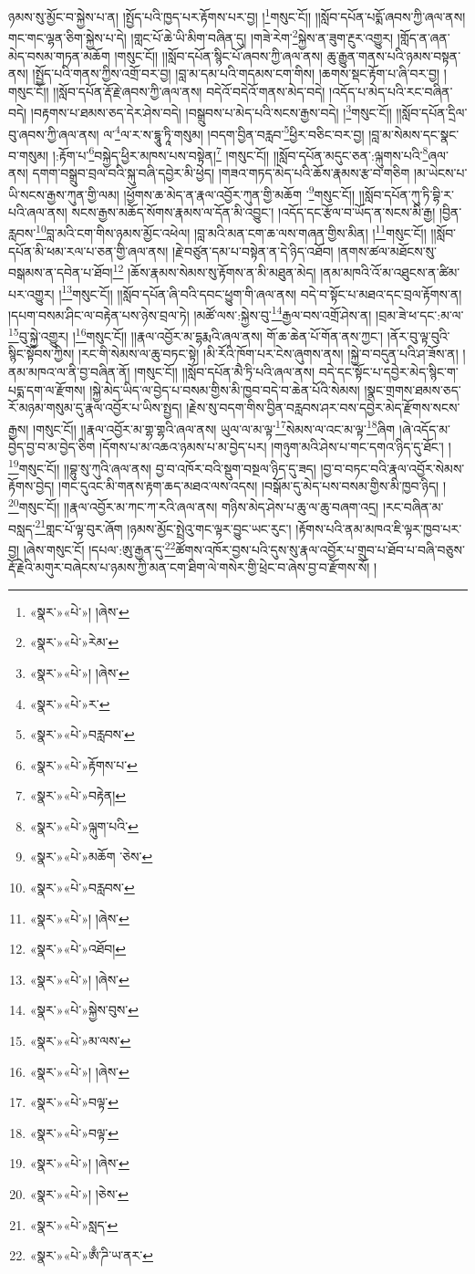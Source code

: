 ཉམས་སུ་མྱོང་བ་སྐྱེས་པ་ན། །སྤྱོད་པའི་ཁྱད་པར་རྟོགས་པར་བྱ། །\footnote{«སྣར་»«པེ་»། །ཞེས་}གསུང་ངོ།། །།སློབ་དཔོན་པདྨོ་ཞབས་ཀྱི་ཞལ་ནས། གང་གང་ལྷན་ཅིག་སྐྱེས་པ་དེ། །གླང་པོ་ཆེ་ཡི་མིག་བཞིན་དུ། །གཟེ་རེག་\footnote{«སྣར་»«པེ་»རེམ་}སྐྱེས་ན་ཟུག་རྔུར་འགྱུར། །གློད་ན་ཞན་མེད་བསམ་གཏན་མཆོག །གསུང་ངོ།། །།སློབ་དཔོན་སྙིང་པོ་ཞབས་ཀྱི་ཞལ་ནས། ཆུ་རྒྱུན་གནས་པའི་ཉམས་བསྟན་ནས། །སྤྱོད་པའི་གནས་ཀྱིས་འགྲོ་བར་བྱ། །བླ་མ་དམ་པའི་གདམས་ངག་གིས། །ཆགས་སྡང་རྟོག་པ་ཞི་བར་བྱ། །གསུང་ངོ།། །།སློབ་དཔོན་རྡོ་རྗེ་ཞབས་ཀྱི་ཞལ་ནས། བདེའོ་བདེའོ་གནས་མེད་བདེ། །འདོད་པ་མེད་པའི་རང་བཞིན་བདེ། །བརྟགས་པ་ཐམས་ཅད་དེར་ཤེས་བདེ། །བསྒྲུབས་པ་མེད་པའི་སངས་རྒྱས་བདེ། །\footnote{«སྣར་»«པེ་»། །ཞེས་}གསུང་ངོ།། །།སློབ་དཔོན་དྲིལ་བུ་ཞབས་ཀྱི་ཞལ་ནས། ལ་\footnote{«སྣར་»«པེ་»ར་}ལ་ར་ས་དྷཱུ་ཏཱི་གསུམ། །བདག་བྱིན་བརླབ་\footnote{«སྣར་»«པེ་»བརླབས་}ཕྱིར་བཅིང་བར་བྱ། །བླ་མ་སེམས་དང་སྣང་བ་གསུམ། །:རྟོག་པ་\footnote{«སྣར་»«པེ་»རྟོགས་པ་}བསྐྱེད་ཕྱིར་མཁས་པས་བསྟེན།\footnote{«སྣར་»«པེ་»བརྟེན།} །གསུང་ངོ།། །།སློབ་དཔོན་མདུང་ཅན་:ལྐུགས་པའི་\footnote{«སྣར་»«པེ་»ལྐུག་པའི་}ཞལ་ནས། དགག་བསྒྲུབ་བྲལ་བའི་སྐུ་བཞི་དབྱེར་མི་ཕྱེད། །གཟའ་གཏད་མེད་པའི་ཆོས་རྣམས་རྩ་བ་གཅིག །མ་ཡེངས་པ་ཡི་སངས་རྒྱས་ཀུན་གྱི་ལམ། །ཕྱོགས་ཆ་མེད་ན་རྣལ་འབྱོར་ཀུན་གྱི་མཆོག ་\footnote{«སྣར་»«པེ་»མཆོག ་ཅེས་}གསུང་ངོ།། །།སློབ་དཔོན་ཀུ་ཏི་བྷི་ར་པའི་ཞལ་ནས། སངས་རྒྱས་མཆོད་སོགས་རྣམས་ལ་དོན་མི་འབྱུང་། །འདོད་དང་རྩོལ་བ་ཡོད་ན་སངས་མི་རྒྱ། །བྱིན་རླབས་\footnote{«སྣར་»«པེ་»བརླབས་}བླ་མའི་ངག་གིས་ཉམས་མྱོང་འཕེལ། །བླ་མའི་མན་ངག་ཆ་ལས་གཞན་གྱིས་མིན། །\footnote{«སྣར་»«པེ་»། །ཞེས་}གསུང་ངོ།། །།སློབ་དཔོན་མི་ཕམ་རལ་པ་ཅན་གྱི་ཞལ་ནས། །རྗེ་བཙུན་དམ་པ་བསྟེན་ན་དེ་ཉིད་འཐོབ། །ནགས་ཚལ་མཐོངས་སུ་བསྒམས་ན་དབེན་པ་ཐོབ།\footnote{«སྣར་»«པེ་»འཐོབ།} །ཆོས་རྣམས་སེམས་སུ་རྟོགས་ན་མི་མཐུན་མེད། །ནམ་མཁའི་འོ་མ་འཐུངས་ན་ཚིམ་པར་འགྱུར། །\footnote{«སྣར་»«པེ་»། །ཞེས་}གསུང་ངོ།། །།སློབ་དཔོན་ཞི་བའི་དབང་ཕྱུག་གི་ཞལ་ནས། བདེ་བ་སྟོང་པ་མཐའ་དང་བྲལ་རྟོགས་ན། །དཔག་བསམ་ཤིང་ལ་བརྟེན་པས་ཉེས་བྲལ་ཏེ། །མཚོ་ལས་:སྐྱེས་བུ་\footnote{«སྣར་»«པེ་»སྐྱེས་བུས་}རྒྱལ་བས་འགྲོ་ཤེས་ན། །བྲམ་ཟེ་ཕ་དང་:མ་ལ་\footnote{«སྣར་»«པེ་»མ་ལས་}བུ་སྐྱེ་འགྱུར། །\footnote{«སྣར་»«པེ་»། །ཞེས་}གསུང་ངོ།། །།རྣལ་འབྱོར་མ་དྷརྨའི་ཞལ་ནས། གོ་ཆ་ཆེན་པོ་གོན་ནས་ཀྱང་། །ནོར་བུ་ལྟ་བུའི་སྙིང་སྟོབས་ཀྱིས། །རང་གི་སེམས་ལ་ཆུ་བཏང་སྟེ། །མི་རོའི་ཁོག་པར་ངེས་ཞུགས་ནས། །སྐྱེ་བ་བདུན་པའི་ཤ་ཟོས་ན། །
ནམ་མཁའ་ལ་ནི་བྱ་བཞིན་ནོ། །གསུང་ངོ།། །།སློབ་དཔོན་མཻ་ཏྲི་པའི་ཞལ་ནས། བདེ་དང་སྟོང་པ་དབྱེར་མེད་སྙིང་ག་པདྨ་དག་ལ་རྫོགས། །སྐྱེ་མེད་ཡིད་ལ་བྱེད་པ་བསམ་གྱིས་མི་ཁྱབ་བདེ་བ་ཆེན་པོའི་སེམས། །སྣང་གྲགས་ཐམས་ཅད་རོ་མཉམ་གསུམ་དུ་རྣལ་འབྱོར་པ་ཡིས་སྤྱད། །རྗེས་སུ་བདག་གིས་བྱིན་བརླབས་ཤར་བས་དབྱེར་མེད་རྫོགས་སངས་རྒྱས། །གསུང་ངོ།། །།རྣལ་འབྱོར་མ་གྷ་གྷའི་ཞལ་ནས། ཡུལ་ལ་མ་ལྟ་\footnote{«སྣར་»«པེ་»བལྟ་}སེམས་ལ་འང་མ་ལྟ་\footnote{«སྣར་»«པེ་»བལྟ་}ཞིག །ཞེ་འདོད་མ་བྱེད་བྱ་བ་མ་བྱེད་ཅིག །དོགས་པ་མ་འཆའ་ཉམས་པ་མ་བྱེད་པར། །གཉུག་མའི་ཤེས་པ་གང་དགའ་ཉིད་དུ་ཐོང་། །\footnote{«སྣར་»«པེ་»། །ཞེས་}གསུང་ངོ།། །།བྷུ་སུ་ཀུའི་ཞལ་ནས། བྱ་བ་འཁོར་བའི་སྡུག་བསྔལ་ཉིད་དུ་ཟད། །བྱ་བ་བཏང་བའི་རྣལ་འབྱོར་སེམས་རྟོགས་བྱེད། །གང་དུའང་མི་གནས་རྟག་ཆད་མཐའ་ལས་འདས། །བསྒོམ་དུ་མེད་པས་བསམ་གྱིས་མི་ཁྱབ་ཉིད། །\footnote{«སྣར་»«པེ་»། །ཅེས་}གསུང་ངོ།། །།རྣལ་འབྱོར་མ་ཀང་ཀ་རའི་ཞལ་ནས། གཉིས་མེད་ཤེས་པ་ཆུ་ལ་ཆུ་བཞག་འདྲ། །རང་བཞིན་མ་བསླད་\footnote{«སྣར་»«པེ་»སླད་}གླང་པོ་ལྟ་བུར་ཞོག །ཉམས་མྱོང་སྤྲེའུ་གང་ལྟར་བྱུང་ཡང་རུང་། །རྟོགས་པའི་ནམ་མཁའ་ཇི་ལྟར་ཁྱབ་པར་བྱ། །ཞེས་གསུང་ངོ། །དཔལ་:ཨུ་རྒྱན་དུ་\footnote{«སྣར་»«པེ་»ཨྃ་ཌི་ཡ་ནར་}ཚོགས་འཁོར་བྱས་པའི་དུས་སུ་རྣལ་འབྱོར་པ་གྲུབ་པ་ཐོབ་པ་བཞི་བཅུས་རྡོ་རྗེའི་མགུར་བཞེངས་པ་ཉམས་ཀྱི་མན་ངག་ཐིག་ལེ་གསེར་གྱི་ཕྲེང་བ་ཞེས་བྱ་བ་རྫོགས་སོ། ། 